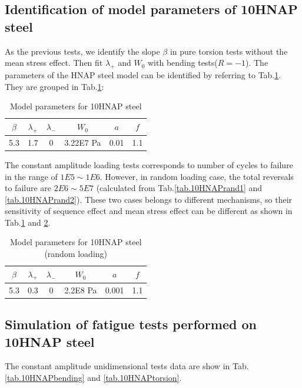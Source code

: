 \subsection{Identification of model parameters of 10HNAP steel}
As the previous tests, we identify the slope $\beta$ in pure torsion tests without the mean stress effect. Then fit $\lambda_+$ and $W_0$ with bending tests($R=-1$). The parameters of the HNAP steel model can be identified by referring to Tab.\ref{tab.10HNAP.para}. They are grouped in Tab.\ref{tab.10HNAP.para}:
\begin{table}[!h]
\centering
\begin{tabular}{|c|c|c|c|c|c|}
	\hline
	\textbf{$\beta$} & \textbf{$\lambda_+$} & \textbf{$\lambda_-$} & \textbf{$W_0$} & \textbf{$a$} & \textbf{$f$} \\ \hline
	5.3    & 1.7 &0         &3.22E7 Pa  & 0.01    & 1.1 \\ \hline
\end{tabular}
\caption{Model parameters for 10HNAP steel}
\label{tab.10HNAP.para}
\end{table}

The constant amplitude loading tests corresponds to number of cycles to failure in the range of $1E5\sim1E6$. However, in random loading case, the total reversals to failure are $2E6\sim5E7$ (calculated from Tab.\ref{tab.10HNAPrand1} and \ref{tab.10HNAPrand2}). These two cases belongs to different mechanisms, so their sensitivity of sequence effect and mean stress effect can be different as shown in Tab.\ref{tab.10HNAP.para} and \ref{tab.10HNAP.para.random}.

\begin{table}[!h]
	\centering
	\begin{tabular}{|c|c|c|c|c|c|}
		\hline
		\textbf{$\beta$} & \textbf{$\lambda_+$} & \textbf{$\lambda_-$} & \textbf{$W_0$} & \textbf{$a$} & \textbf{$f$} \\ \hline
		5.3    & 0.3 &0         &2.2E8 Pa  & 0.001   & 1.1 \\ \hline
	\end{tabular}
	\caption{Model parameters for 10HNAP steel (random loading)}
	\label{tab.10HNAP.para.random}
\end{table}

\newpage
\subsection{Simulation of fatigue tests performed on 10HNAP steel}
The constant amplitude unidimensional tests data are show in Tab.\ref{tab.10HNAPbending} and \ref{tab.10HNAPtorsion}.

